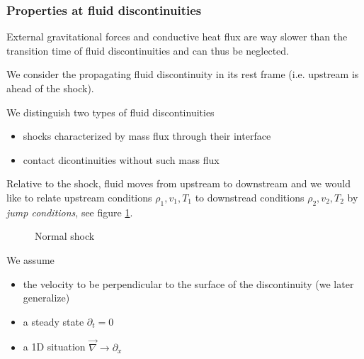 
\subsubsection{Properties at fluid discontinuities}
External gravitational forces and conductive heat flux are way slower than the transition time
of fluid discontinuities and can thus be neglected.

We consider the propagating fluid discontinuity in its rest frame (i.e. upstream is ahead of the shock).

We distinguish \textcolor{blue1}{two types of fluid discontinuities}
\begin{itemize}
    \item shocks characterized by mass flux through their interface
    \item contact dicontinuities without such mass flux
\end{itemize}

Relative to the shock, fluid moves from upstream to downstream and we would like to relate
upstream conditions $\rho_1,v_1,T_1$ to downstread conditions $\rho_2,v_2,T_2$ by \textit{jump conditions}, see figure \ref{fig:normal_shock}.

\begin{figure}[!htb]
    \centering
    
    \caption{Normal shock}
    \label{fig:normal_shock}
\end{figure}

We assume
\begin{itemize}
    \item the velocity to be perpendicular to the surface of the discontinuity (we later generalize)
    \item a steady state $\partial_t = 0$
    \item a 1D situation $\vec{\nabla} \rightarrow \partial_x$
\end{itemize}


